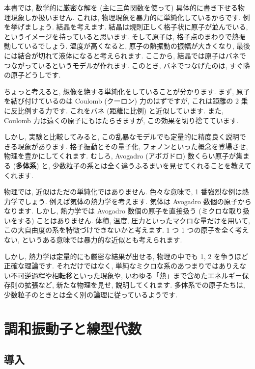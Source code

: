 \documentclass[openany, a4paper, oneside]{jsbook}
\begin{document}
本書では, 数学的に厳密な解を (主に三角関数を使って) 具体的に書き下せる物理現象しか扱いません.
これは, 物理現象を暴力的に単純化しているからです.
例を挙げましょう.
結晶を考えます.
結晶は規則正しく格子状に原子が並んでいる, というイメージを持っていると思います.
そして原子は, 格子点のまわりで熱振動しているでしょう.
温度が高くなると, 原子の熱振動の振幅が大きくなり,
最後には結合が切れて液体になると考えられます.
ここから, 結晶では原子はバネでつながっているというモデルが作れます.
このとき, バネでつなげたのは, すぐ隣の原子どうしです.

ちょっと考えると, 想像を絶する単純化をしていることが分かります.
まず, 原子を結び付けているのは Coulomb (クーロン) 力のはずですが,
これは距離の 2 乗に反比例する力です.
これをバネ (距離に比例) と近似しています.
また, Coulomb 力は遠くの原子にもはたらきますが, この効果を切り捨てています.

しかし, 実験と比較してみると, この乱暴なモデルでも定量的に精度良く説明できる現象があります.
格子振動とその量子化, フォノンといった概念を登場させ, 物理を豊かにしてくれます.
むしろ, Avogadro (アボガドロ) 数くらい原子が集まる (\textbf{多体系}) と,
少数粒子の系とは全く違うふるまいを見せてくれることを教えてくれます.

物理では, 近似はただの単純化ではありません.
色々な意味で, 1 番強烈な例は熱力学でしょう.
例えば気体の熱力学を考えます.
気体は Avogadro 数個の原子からなります.
しかし, 熱力学では Avogadro 数個の原子を直接扱う (ミクロな取り扱いをする) ことはありません.
体積, 温度, 圧力といったマクロな量だけを用いて, この大自由度の系を特徴づけできないかと考えます.
1 つ 1 つの原子を全く考えない, というある意味では暴力的な近似とも考えられます.

しかし, 熱力学は定量的にも厳密な結果が出せる, 物理の中でも 1, 2 を争うほど正確な理論です.
それだけではなく, 単純なミクロな系のあつまりではありえない不可逆過程や相転移といった現象や,
いわゆる「熱」まで含めたエネルギー保存則の拡張など,
新たな物理を見せ, 説明してくれます.
多体系での原子たちは, 少数粒子のときとは全く別の論理に従っているようです.
\section{調和振動子と線型代数}

\subsection{導入}
\end{document}
